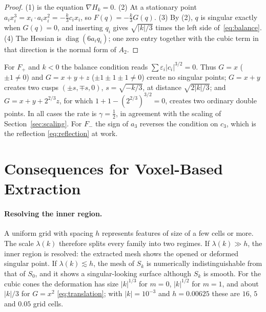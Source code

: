 \begin{proof}
(1) is the equation $\nabla H_k=0$. (2) At a stationary point
$a_ix_i^3=x_i\cdot a_ix_i^2=-\frac k3c_ix_i$, so $F(q)=-\frac k3G(q)$.
(3) By (2), $q$ is singular exactly when $G(q)=0$, and inserting $q_i$ gives
$\sqrt{|k|/3}$ times the left side of~\eqref{eq:balance}. (4) The Hessian is
$\operatorname{diag}(6a_iq_i)$; one zero entry together with the cubic term in
that direction is the normal form of $A_2$.
\end{proof}

For $F_+$ and $k<0$ the balance condition reads $\sum\varepsilon_i|c_i|^{3/2}=0$.
Thus $G=x$ ($\pm1\neq0$) and $G=x+y+z$ ($\pm1\pm1\pm1\neq0$) create no singular
points; $G=x+y$ creates two cusps $(\pm s,\mp s,0)$, $s=\sqrt{-k/3}$, at
distance $\sqrt{2|k|/3}$; and $G=x+y+2^{2/3}z$, for which $1+1-(2^{2/3})^{3/2}=0$,
creates two ordinary double points. In all cases the rate is $\gamma=\frac12$,
in agreement with the scaling of Section~\ref{sec:scaling}. For $F_-$ the sign
of $a_3$ reverses the condition on $c_3$, which is the reflection
\eqref{eq:reflection} at work.

\section{Consequences for Voxel-Based Extraction}
\label{sec:voxel-consequences}

\paragraph{Resolving the inner region.}
A uniform grid with spacing $h$ represents features of size of a few cells or
more. The scale $\lambda(k)$ therefore splits every family into two regimes.
If $\lambda(k)\gg h$, the inner region is resolved: the extracted mesh shows
the opened or deformed singular point. If $\lambda(k)\lesssim h$, the mesh of
$S_k$ is numerically indistinguishable from that of $S_0$, and it shows a
singular-looking surface although $S_k$ is smooth. For the cubic cones the
deformation has size $|k|^{1/3}$ for $m=0$, $|k|^{1/2}$ for $m=1$, and about
$|k|/3$ for $G=x^2$ \eqref{eq:translation}; with $|k|=10^{-3}$ and $h=0.00625$
these are $16$, $5$ and $0.05$ grid cells.

